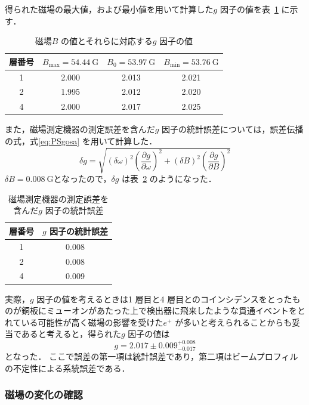得られた磁場の最大値，および最小値を用いて計算した$g$ 因子の値を表~\ref{tab:PSgSysErr} に示す．
\begin{table}[h]
	\centering
	\caption{磁場$B$ の値とそれらに対応する$g$ 因子の値}
	\begin{tabular}{cccc}\toprule
	層番号 & $B_{\mathrm{max}} = 54.44~\mathrm{G}$ & $B_{0} = 53.97~\mathrm{G}$ & $B_{\mathrm{min}} = 53.76~\mathrm{G}$ \\ \midrule
	1 & 2.000 & 2.013 & 2.021 \\
	2 & 1.995 & 2.012 & 2.020 \\
	4 & 2.000 & 2.017 & 2.025 \\ \bottomrule 
	\end{tabular}\label{tab:PSgSysErr}
\end{table}%

また，磁場測定機器の測定誤差を含んだ$g$ 因子の統計誤差については，誤差伝播の式，式\eqref{eq:PSgosa} を用いて計算した．
\begin{equation}
\delta g = \sqrt{\left(\delta\omega\right)^{2}\left(\frac{\partial g}{\partial\omega}\right)^{2} + \left(\delta B\right)^{2}\left(\frac{\partial g}{\partial B}\right)^{2}}
\label{eq:PSgosa}
\end{equation}%
$\delta B = 0.008~\mathrm{G}$となったので，$\delta g$ は表~\ref{tab:PSgStatErr} のようになった．
\begin{table}
	\centering
	\caption{磁場測定機器の測定誤差を含んだ$g$ 因子の統計誤差}
	\begin{tabular}{cc}\toprule
	層番号 & $g$ 因子の統計誤差\\ \midrule
	1 & 0.008 \\ 
	2 & 0.008 \\
	4 & 0.009 \\ \bottomrule
	\end{tabular}\label{tab:PSgStatErr}
\end{table}%

実際，$g$ 因子の値を考えるときは1 層目と4 層目とのコインシデンスをとったものが銅板にミューオンがあたった上で検出器に飛来したような貫通イベントをとれている可能性が高く磁場の影響を受けた$e^{+}$ が多いと考えられることからも妥当であると考えると，得られた$g$ 因子の値は
\[g = 2.017 \pm 0.009 ^{+0.008}_{-0.017}\]
となった．
ここで誤差の第一項は統計誤差であり，第二項はビームプロフィルの不定性による系統誤差である．

\subsubsection{磁場の変化の確認}
\label{subsubsec:PSMagChangeCheck}

